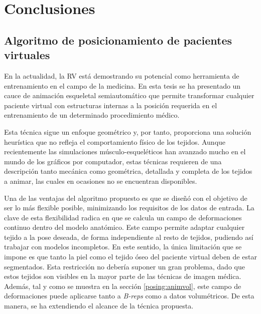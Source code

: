 \chapter{Conclusiones}
\label{cap:conclu}

\section{Algoritmo de posicionamiento de pacientes virtuales}
\label{conclu:posing}

En la actualidad, la \ac{RV} está demostrando su potencial como herramienta de entrenamiento en el campo de la medicina. %
En esta tesis se ha presentado un cauce de animación esqueletal semiautomático que permite transformar cualquier paciente virtual con estructuras internas a la posición requerida en el entrenamiento de un determinado procedimiento médico.

Esta técnica sigue un enfoque geométrico y, por tanto, proporciona una solución heurística que no refleja  el comportamiento físico de los tejidos. Aunque recientemente las simulaciones músculo-esqueléticos han avanzado mucho en el mundo de los gráficos por computador, estas técnicas requieren de una descripción tanto mecánica como geométrica, detallada y completa de los tejidos a animar, las cuales en ocasiones no se encuentran disponibles. 

Una de las ventajas del algoritmo propuesto es que se diseñó con el objetivo de ser lo más flexible posible, minimizando los requisitos de los datos de entrada. La clave de esta flexibilidad radica en que se calcula un campo de deformaciones continuo dentro del modelo anatómico. Este campo permite adaptar cualquier tejido a la pose deseada, de forma independiente al resto de tejidos, pudiendo así trabajar con modelos incompletos. En este sentido, la única limitación que se impone es que tanto la piel como el tejido óseo del paciente virtual deben de estar segmentados. Esta restricción no debería suponer un gran problema, dado que estos tejidos son visibles en la mayor parte de las técnicas de imagen médica. Además, tal y como se muestra en la sección \ref{posing:animvol}, este campo de deformaciones puede aplicarse tanto a \emph{\acs{B-rep}s} como a datos volumétricos. De esta manera, se ha extendiendo el alcance de la técnica propuesta.

